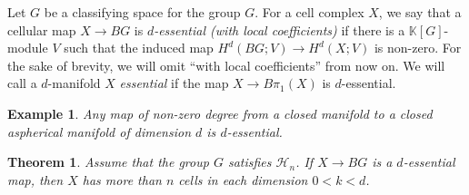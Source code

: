 \documentclass[11pt,letterpaper]{amsart}
\newtheorem{theorem}{Theorem}
\newtheorem*{example}{Example}
\begin{document}
Let $G$ be a classifying space for the group $G$. For a cell complex $X$, we say that a cellular map $X\rightarrow BG$ is {\it $d$-essential (with local coefficients)} if there is a $\mathbb K[G]$-module $V$ such that the induced map $H^{d}(BG;V)\rightarrow H^{d}(X;V)$ is non-zero. For the sake of brevity, we will omit ``with local coefficients'' from now on. We will call a $d$-manifold $X$ {\it essential} if the map $X\rightarrow B\pi_1(X)$ is $d$-essential.
\begin{example}
Any map of non-zero degree from a closed manifold to a closed aspherical manifold of dimension $d$ is $d$-essential. 
\end{example}
\begin{theorem}
\label{essential}
Assume that the group $G$ satisfies $\mathcal H_{n}$. If $X\rightarrow BG$ is a $d$-essential map, then $X$ has more than $n$ cells in each dimension $0<k<d$. 
\end{theorem}
\end{document}
